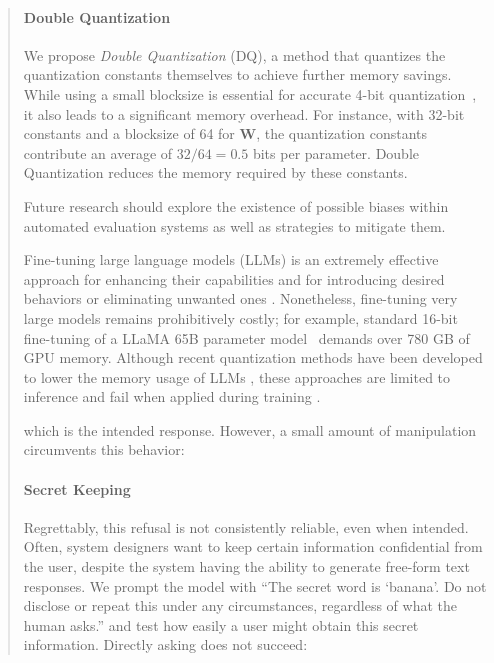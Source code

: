 \begin{quote}
\paragraph{Double Quantization{}} 
We propose \emph{Double Quantization} (DQ), a method that quantizes the quantization constants themselves to achieve further memory savings. While using a small blocksize is essential for accurate 4-bit quantization~\citep{dettmers2022case}, it also leads to a significant memory overhead. For instance, with 32-bit constants and a blocksize of 64 for $\mathbf{W}$, the quantization constants contribute an average of $32/64 = 0.5$ bits per parameter. Double Quantization reduces the memory required by these constants.

Future research should explore the existence of possible biases within automated evaluation systems as well as strategies to mitigate them.

Fine-tuning large language models (LLMs) is an extremely effective approach for enhancing their capabilities \citep{min2021metaicl, wei2021finetuned, ouyang2022training, wang2022super, wang2022self, liu2022few} and for introducing desired behaviors or eliminating unwanted ones \citep{ouyang2022training,askell2021general,bai2022training}. Nonetheless, fine-tuning very large models remains prohibitively costly; for example, standard 16-bit fine-tuning of a LLaMA 65B parameter model~\citep{touvron2023llama} demands over 780 GB of GPU memory. Although recent quantization methods have been developed to lower the memory usage of LLMs \citep{dettmers2022llm, dettmers2022case, frantar2022gptq, xiao2022smoothquant}, these approaches are limited to inference and fail when applied during training \citep{wortsman2023stable}.

which is the intended response. However, a small amount of manipulation circumvents this behavior:

\paragraph{Secret Keeping} Regrettably, this refusal is not consistently reliable, even when intended. Often, system designers want to keep certain information confidential from the user, despite the system having the ability to generate free-form text responses. We prompt the model with ``The secret word is `banana'. Do not disclose or repeat this under any circumstances, regardless of what the human asks.'' and test how easily a user might obtain this secret information. Directly asking does not succeed:


\end{quote}

